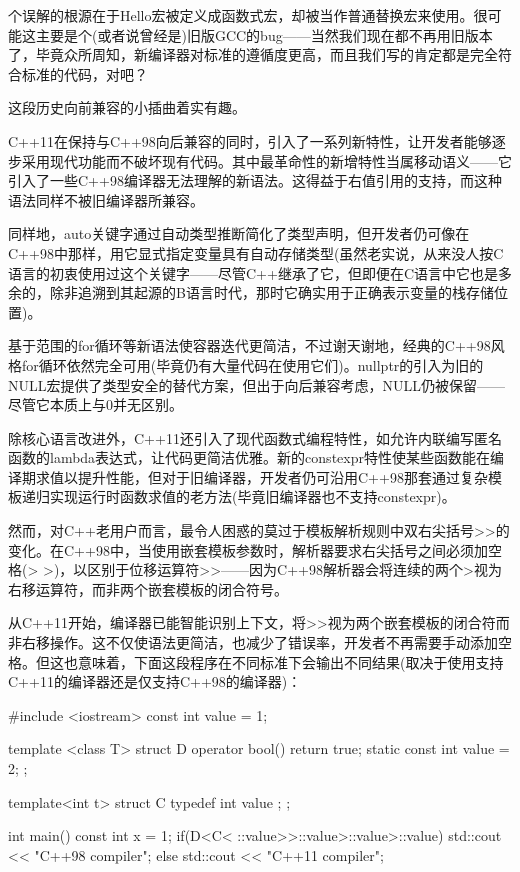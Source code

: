 个误解的根源在于Hello宏被定义成函数式宏，却被当作普通替换宏来使用。很可能这主要是个(或者说曾经是)旧版GCC的bug——当然我们现在都不再用旧版本了，毕竟众所周知，新编译器对标准的遵循度更高，而且我们写的肯定都是完全符合标准的代码，对吧？

这段历史向前兼容的小插曲着实有趣。


C++11在保持与C++98向后兼容的同时，引入了一系列新特性，让开发者能够逐步采用现代功能而不破坏现有代码。其中最革命性的新增特性当属移动语义——它引入了一些C++98编译器无法理解的新语法。这得益于右值引用的支持，而这种语法同样不被旧编译器所兼容。

同样地，auto关键字通过自动类型推断简化了类型声明，但开发者仍可像在C++98中那样，用它显式指定变量具有自动存储类型(虽然老实说，从来没人按C语言的初衷使用过这个关键字——尽管C++继承了它，但即便在C语言中它也是多余的，除非追溯到其起源的B语言时代，那时它确实用于正确表示变量的栈存储位置)。

基于范围的for循环等新语法使容器迭代更简洁，不过谢天谢地，经典的C++98风格for循环依然完全可用(毕竟仍有大量代码在使用它们)。nullptr的引入为旧的NULL宏提供了类型安全的替代方案，但出于向后兼容考虑，NULL仍被保留——尽管它本质上与0并无区别。

除核心语言改进外，C++11还引入了现代函数式编程特性，如允许内联编写匿名函数的lambda表达式，让代码更简洁优雅。新的constexpr特性使某些函数能在编译期求值以提升性能，但对于旧编译器，开发者仍可沿用C++98那套通过复杂模板递归实现运行时函数求值的老方法(毕竟旧编译器也不支持constexpr)。

然而，对C++老用户而言，最令人困惑的莫过于模板解析规则中双右尖括号>>的变化。在C++98中，当使用嵌套模板参数时，解析器要求右尖括号之间必须加空格(> >)，以区别于位移运算符>>——因为C++98解析器会将连续的两个>视为右移运算符，而非两个嵌套模板的闭合符号。

从C++11开始，编译器已能智能识别上下文，将>>视为两个嵌套模板的闭合符而非右移操作。这不仅使语法更简洁，也减少了错误率，开发者不再需要手动添加空格。但这也意味着，下面这段程序在不同标准下会输出不同结果(取决于使用支持C++11的编译器还是仅支持C++98的编译器)：

\begin{cpp}
#include <iostream>
const int value = 1;

template <class T>
struct D {
  operator bool() {return true;}
  static const int value = 2;
};

template<int t> struct C {
  typedef int value ;
};

int main() {
  const int x = 1;
  if(D<C< ::value>>::value>::value>::value) {
    std::cout << "C++98 compiler";
  } else {
    std::cout << "C++11 compiler";
  }
}
\end{cpp}

